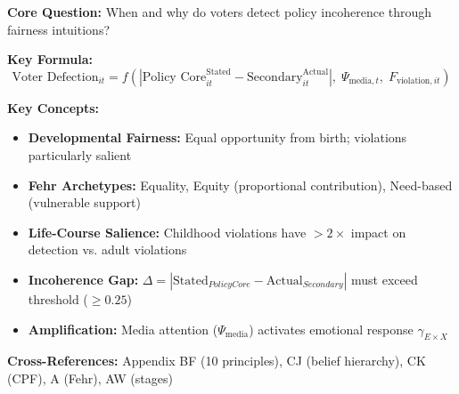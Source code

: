 \begin{tcolorbox}[colback=blue!5!white, colframe=blue!75!black,
    title=Quick Reference: Developmental Fairness]

\textbf{Core Question:} When and why do voters detect policy incoherence through fairness intuitions?

\textbf{Key Formula:}
\begin{equation}
\text{Voter Defection}_{it} = f\left(|\text{Policy Core}^{\text{Stated}}_{it} - \text{Secondary}^{\text{Actual}}_{it}|, \; \Psi_{\text{media},t}, \; F_{\text{violation},it}\right)
\end{equation}

\textbf{Key Concepts:}
\begin{itemize}[nosep]
\item \textbf{Developmental Fairness:} Equal opportunity from birth; violations particularly salient
\item \textbf{Fehr Archetypes:} Equality, Equity (proportional contribution), Need-based (vulnerable support)
\item \textbf{Life-Course Salience:} Childhood violations have $>2\times$ impact on detection vs. adult violations
\item \textbf{Incoherence Gap:} $\Delta = |\text{Stated}_{Policy Core} - \text{Actual}_{Secondary}|$ must exceed threshold ($\geq 0.25$)
\item \textbf{Amplification:} Media attention ($\Psi_{\text{media}}$) activates emotional response $\gamma_{E \times X}$
\end{itemize}

\textbf{Cross-References:}
Appendix BF (10 principles), CJ (belief hierarchy), CK (CPF), A (Fehr), AW (stages)

\end{tcolorbox}



